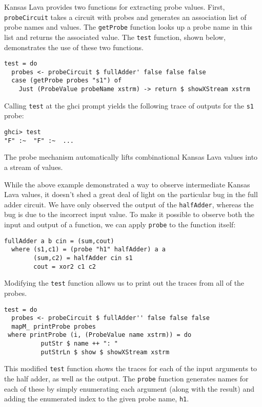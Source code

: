 \documentclass{llncs}
\begin{document}
Kansas Lava provides two functions for extracting probe %
values. First, \verb!probeCircuit! takes a circuit with probes and generates an
association list of probe names and values. The \verb!getProbe! function looks
up a probe name in this list and returns the associated value. The \verb!test!
function, shown below, demonstrates the use of these two functions.

\begin{verbatim}
test = do
  probes <- probeCircuit $ fullAdder' false false false
  case (getProbe probes "s1") of
    Just (ProbeValue probeName xstrm) -> return $ showXStream xstrm
\end{verbatim}

Calling \verb!test! at the ghci prompt yields the following trace of outputs for
the \verb!s1! probe: 

\begin{verbatim}
ghci> test
"F" :~  "F" :~  ...
\end{verbatim}

The probe mechanism automatically lifts combinational Kansas Lava
values into a stream of values.

While the above example demonstrated a way to observe intermediate Kansas
Lava values, it doesn't shed a great deal of light on the particular
bug in the full adder circuit. We have only observed the output of the
\verb!halfAdder!, whereas the bug is due to the incorrect input value.
To make it possible to observe both the input and output of a
function, we can apply \verb!probe! to the function itself:

\begin{verbatim}
fullAdder a b cin = (sum,cout)
  where (s1,c1) = (probe "h1" halfAdder) a a
        (sum,c2) = halfAdder cin s1
        cout = xor2 c1 c2
\end{verbatim}


Modifying the \verb!test! function allows us to print out the traces from all of
the probes.

\begin{verbatim}
test = do
  probes <- probeCircuit $ fullAdder'' false false false
  mapM_ printProbe probes
 where printProbe (i, (ProbeValue name xstrm)) = do
          putStr $ name ++ ": "
          putStrLn $ show $ showXStream xstrm
\end{verbatim}

This modified \verb!test! function shows the traces for each of the input
arguments to the half adder, as well as the output. The \verb!probe! function
generates names for each of these by simply enumerating each argument (along
with the result) and adding the enumerated index to the given probe name, \verb!h1!.
\end{document}
